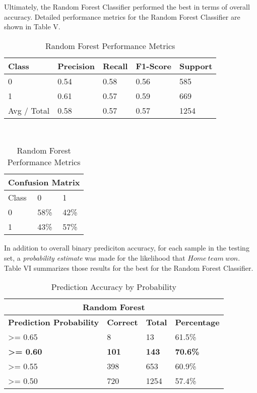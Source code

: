 \documentclass[letterpaper, 10 pt, conference]{ieeeconf}
\begin{document}
Ultimately, the Random Forest Classifier performed the best in terms of overall accuracy.  Detailed performance metrics for the Random Forest Classifier are shown in Table V.

\begin{table}[]
\centering
\caption{Random Forest Performance Metrics}
\begin{tabular}{@{}lllll@{}}
\toprule
\textbf{Class} & \textbf{Precision} & \textbf{Recall} & \textbf{F1-Score} & \textbf{Support} \\ \midrule
0              & 0.54               & 0.58            & 0.56              & 585              \\
1              & 0.61               & 0.57            & 0.59              & 669              \\ \midrule
Avg / Total    & 0.58               & 0.57            & 0.57              & 1254             \\ \bottomrule
\end{tabular}\\\medskip
\centering
\begin{tabular}{@{}lll@{}}
\toprule
\multicolumn{3}{l}{\textbf{Confusion Matrix}} \\ \midrule
Class             & 0               & 1              \\
0            & 58\%            & 42\%           \\
1            & 43\%            & 57\%           \\ \bottomrule
\end{tabular}
\end{table}

In addition to overall binary prediciton accuracy, for each sample in the testing set, a \textit{probability estimate} was made for the likelihood that $Home\ team\ won$. Table VI summarizes those results for the best for the Random Forest Classifier.


\begin{table}[h]
\caption{Prediction Accuracy by Probability}
\centering
\begin{tabular}{@{}llll@{}}

\multicolumn{4}{c}{\textbf{Random Forest}}                                                \\\toprule
\textbf{Prediction Probability} & \textbf{Correct} & \textbf{Total} & \textbf{Percentage} \\ \midrule
\textgreater= 0.65              & 8                & 13             & 61.5\%             \\
\textbf{\textgreater= 0.60}     & \textbf{101}     & \textbf{143}   & \textbf{70.6\%}    \\
\textgreater= 0.55              & 398              & 653            & 60.9\%             \\
\textgreater= 0.50              & 720              & 1254           & 57.4\%             \\ \bottomrule
\end{tabular}
\end{table}
\end{document}
